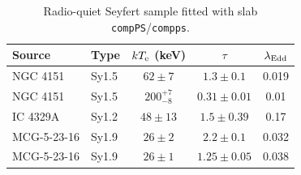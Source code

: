\begin{table}
\centering
\caption{Radio-quiet Seyfert sample fitted with slab \texttt{compPS}/\texttt{compps}.}
\label{tab:compps_sample}
\renewcommand{\arraystretch}{1.25}
\begin{tabular}{llccc}
\hline
Source & Type & $kT_{\rm e}$ (keV) & $\tau$ & $\lambda_{\rm Edd}$ \\
\hline
NGC 4151 & Sy1.5 & $62 \pm 7$ & $1.3 \pm 0.1$ & 0.019 \\
NGC 4151 & Sy1.5 & $200^{+7}_{-8}$ & $0.31 \pm 0.01$ & 0.01 \\
IC 4329A & Sy1.2 & $48 \pm 13$ & $1.5 \pm 0.39$ & 0.17 \\
MCG-5-23-16 & Sy1.9 & $26 \pm 2$ & $2.2 \pm 0.1$ & 0.032 \\
MCG-5-23-16 & Sy1.9 & $26 \pm 1$ & $1.25 \pm 0.05$ & 0.038 \\
\hline
\end{tabular}
\renewcommand{\arraystretch}{1.0}
\end{table}